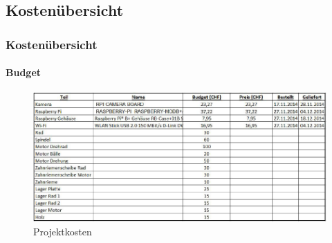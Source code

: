 %				

\subsection{Kostenübersicht}
\begin{frame}
	\frametitle{Kostenübersicht\hfill{}\footnotesize \group}
	\framesubtitle{Budget}
	
	\begin{figure}
		\centering
		\includegraphics[width=1\textwidth]{../../fig/projektkosten.png}
		\caption{Projektkosten}
	\end{figure}
	
	
\end{frame}
